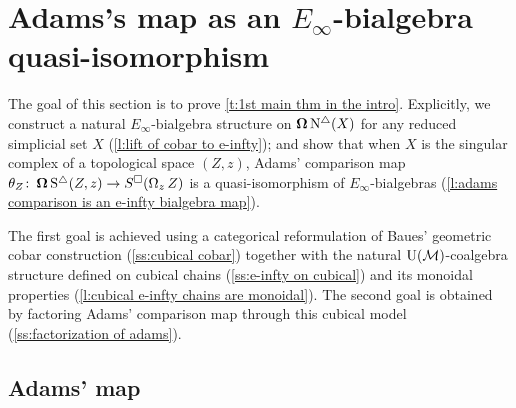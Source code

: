 
\section{Adams's map as an \texorpdfstring{$E_{\infty}$}{E-infty}-bialgebra quasi-isomorphism} \label{s:theorem1}

The goal of this section is to prove \cref{t:1st main thm in the intro}.
Explicitly, we construct a natural $E_{\infty}$-bialgebra structure on $\operatorname{\mathbf{\Omega}} \operatorname{N^{\triangle}}(X)$ for any reduced simplicial set $X$ (\cref{l:lift of cobar to e-infty}); and show that when $X$ is the singular complex of a topological space $(Z, z)$, Adams' comparison map $\theta_Z \colon \operatorname{\mathbf{\Omega}} \operatorname{S^{\triangle}}(Z, z) \to S^{\square}(\operatorname{\Omega}_z Z)$ is a quasi-isomorphism of $E_\infty$-bialgebras (\cref{l:adams comparison is an e-infty bialgebra map}).

The first goal is achieved using a categorical reformulation of Baues' geometric cobar construction (\cref{ss:cubical cobar}) together with the natural ${\operatorname{U}(\mathcal{M})}$-coalgebra structure defined on cubical chains (\cref{ss:e-infty on cubical}) and its monoidal properties (\cref{l:cubical e-infty chains are monoidal}).
The second goal is obtained by factoring Adams' comparison map through this cubical model (\cref{ss:factorization of adams}).

\subsection{Adams' map}\label{adamsmaps}

